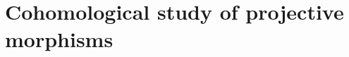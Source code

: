 \section{Cohomological study of projective morphisms}
\label{section-cohomological-study-of-projective-morphisms}

